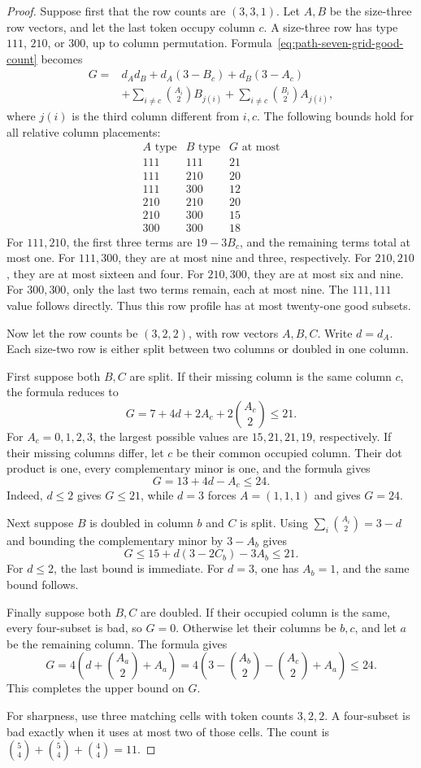 \begin{proof}
Suppose first that the row counts are $(3,3,1)$.
Let $A,B$ be the size-three row vectors, and let the last token occupy column $c$.
A size-three row has type $111$, $210$, or $300$, up to column permutation.
Formula~\eqref{eq:path-seven-grid-good-count} becomes
\[
\begin{split}
 G={}&d_Ad_B+d_A(3-B_c)+d_B(3-A_c)\\
 &+\sum_{i\ne c}\binom{A_i}2B_{j(i)}
  +\sum_{i\ne c}\binom{B_i}2A_{j(i)},
\end{split}
\]
where $j(i)$ is the third column different from $i,c$.
The following bounds hold for all relative column placements:
\[
\begin{array}{c|c|c}
 A\text{ type}&B\text{ type}&G\text{ at most}\\\hline
111&111&21\\
111&210&20\\
111&300&12\\
210&210&20\\
210&300&15\\
300&300&18
\end{array}
\]
For $111,210$, the first three terms are $19-3B_c$, and the remaining terms total at most one.
For $111,300$, they are at most nine and three, respectively.
For $210,210$, they are at most sixteen and four.
For $210,300$, they are at most six and nine.
For $300,300$, only the last two terms remain, each at most nine.
The $111,111$ value follows directly.
Thus this row profile has at most twenty-one good subsets.

Now let the row counts be $(3,2,2)$, with row vectors $A,B,C$.
Write $d=d_A$.
Each size-two row is either split between two columns or doubled in one column.

First suppose both $B,C$ are split.
If their missing column is the same column $c$, the formula reduces to
\[
 G=7+4d+2A_c+2\binom{A_c}2\le21.
\]
For $A_c=0,1,2,3$, the largest possible values are $15,21,21,19$, respectively.
If their missing columns differ, let $c$ be their common occupied column.
Their dot product is one, every complementary minor is one, and the formula gives
\[
 G=13+4d-A_c\le24.
\]
Indeed, $d\le2$ gives $G\le21$, while $d=3$ forces $A=(1,1,1)$ and gives $G=24$.

Next suppose $B$ is doubled in column $b$ and $C$ is split.
Using $\sum_i\binom{A_i}2=3-d$ and bounding the complementary minor by $3-A_b$ gives
\[
 G\le15+d(3-2C_b)-3A_b\le21.
\]
For $d\le2$, the last bound is immediate.
For $d=3$, one has $A_b=1$, and the same bound follows.

Finally suppose both $B,C$ are doubled.
If their occupied column is the same, every four-subset is bad, so $G=0$.
Otherwise let their columns be $b,c$, and let $a$ be the remaining column.
The formula gives
\[
 G=4\left(d+\binom{A_a}2+A_a\right)
  =4\left(3-\binom{A_b}2-\binom{A_c}2+A_a\right)\le24.
\]
This completes the upper bound on $G$.

For sharpness, use three matching cells with token counts $3,2,2$.
A four-subset is bad exactly when it uses at most two of those cells.
The count is $\binom54+\binom54+\binom44=11$.
\end{proof}

